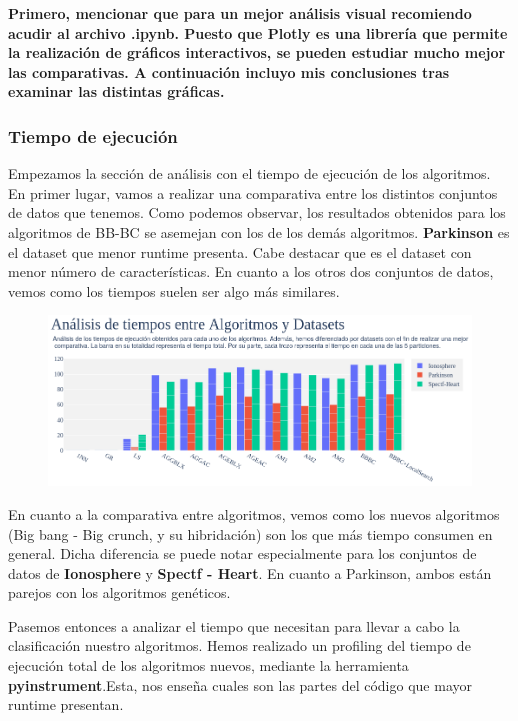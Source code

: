 \documentclass[10pt, a4paper]{article}
\theoremstyle{theorem-style}
\theoremstyle{theorem-style}
\theoremstyle{theorem2-style}
\theoremstyle{definition-style}
\theoremstyle{remark-style}
\theoremstyle{example-style}
\theoremstyle{definition-style}
\theoremstyle{remark-style}
\theoremstyle{remark-style}
\begin{document}
\begin{tcolorbox}
\textbf{Primero, mencionar que para un mejor análisis visual recomiendo acudir al archivo .ipynb. Puesto que Plotly es una librería que permite la realización de gráficos interactivos, se pueden estudiar mucho mejor las comparativas. A continuación incluyo mis conclusiones tras examinar las distintas gráficas.}
\end{tcolorbox}

\subsubsection{Tiempo de ejecución}

Empezamos la sección de análisis con el tiempo de ejecución de los algoritmos. En primer lugar, vamos a realizar una comparativa entre los distintos conjuntos de datos que tenemos. Como podemos observar, los resultados obtenidos para los algoritmos de BB-BC se asemejan con los de los demás algoritmos. \textbf{Parkinson} es el dataset que menor runtime presenta. Cabe destacar que es el dataset con menor número de características. En cuanto a los otros dos conjuntos de datos, vemos como los tiempos suelen ser algo más similares. 

\begin{figure}[htp]
\centering
\includegraphics[scale=0.4750]{Imagenes/tiempos.png}
\label{}
\end{figure}

En cuanto a la comparativa entre algoritmos, vemos como los nuevos algoritmos (Big bang - Big crunch, y su hibridación) son los que más tiempo consumen en general. Dicha diferencia se puede notar especialmente para los conjuntos de datos de \textbf{Ionosphere} y \textbf{Spectf - Heart}. En cuanto a Parkinson, ambos están parejos con los algoritmos genéticos. 

Pasemos entonces a analizar el tiempo que necesitan para llevar a cabo la clasificación nuestro algoritmos. Hemos realizado un profiling del tiempo de ejecución total de los algoritmos nuevos, mediante la herramienta \textbf{pyinstrument}.Esta, nos enseña cuales son las partes del código que mayor runtime presentan. 
\end{document}
